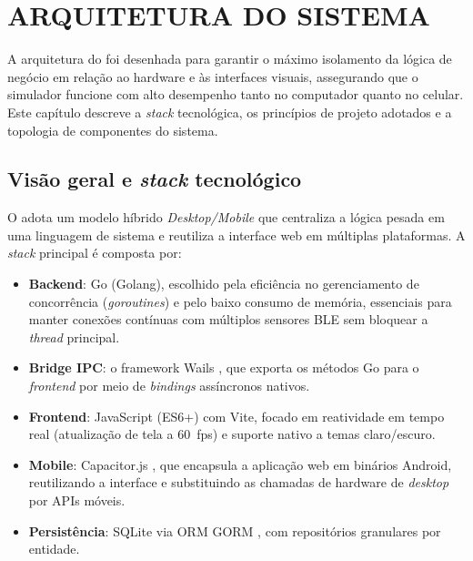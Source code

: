 
\chapter{ARQUITETURA DO SISTEMA}
\label{cap:arquitetura}

A arquitetura do \argus{} foi desenhada para garantir o máximo isolamento da
lógica de negócio em relação ao hardware e às interfaces visuais, assegurando
que o simulador funcione com alto desempenho tanto no computador quanto no
celular. Este capítulo descreve a \textit{stack} tecnológica, os princípios de
projeto adotados e a topologia de componentes do sistema.

\section{Visão geral e \textit{stack} tecnológico}
\label{sec:stack}

O \argus{} adota um modelo híbrido \textit{Desktop/Mobile} que centraliza a
lógica pesada em uma linguagem de sistema e reutiliza a interface web em
múltiplas plataformas. A \textit{stack} principal é composta por:

\begin{itemize}
    \item \textbf{Backend}: Go (Golang), escolhido pela eficiência no
        gerenciamento de concorrência (\textit{goroutines}) e pelo baixo
        consumo de memória, essenciais para manter conexões contínuas com
        múltiplos sensores BLE sem bloquear a \textit{thread} principal.
    \item \textbf{Bridge IPC}: o framework Wails \cite{wails2024}, que exporta
        os métodos Go para o \textit{frontend} por meio de \textit{bindings}
        assíncronos nativos.
    \item \textbf{Frontend}: JavaScript (ES6+) com Vite, focado em
        reatividade em tempo real (atualização de tela a 60~fps) e suporte
        nativo a temas claro/escuro.
    \item \textbf{Mobile}: Capacitor.js \cite{capacitor2024}, que encapsula a
        aplicação web em binários Android, reutilizando a interface e
        substituindo as chamadas de hardware de \textit{desktop} por APIs
        móveis.
    \item \textbf{Persistência}: SQLite \cite{sqlite2024} via ORM GORM
        \cite{gorm2024}, com repositórios granulares por entidade.
\end{itemize}

